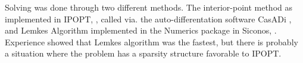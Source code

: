 Solving  was done through two different methods. The interior-point method as implemented in IPOPT, \citep{wachter2006implementation}, called via. the auto-differentation software CasADi \citep{Andersson2019}, and Lemkes Algorithm implemented in the Numerics package in Siconos, \citep{acary2019introduction}. Experience showed that Lemkes algorithm was the fastest, but there is probably a situation where the problem has a sparsity structure favorable to IPOPT.



